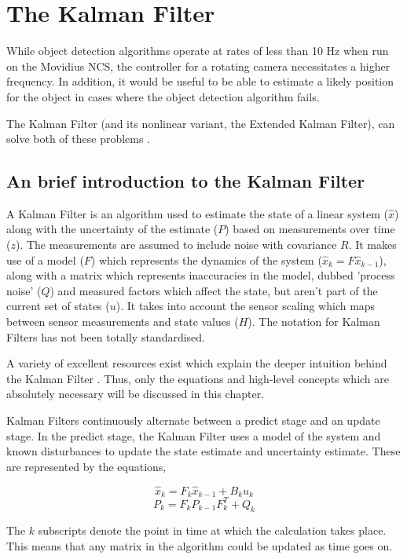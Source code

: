 \section{The Kalman Filter}

While object detection algorithms operate at rates of less than 10 Hz when run on the Movidius NCS, the controller for a rotating camera necessitates a higher frequency. In addition, it would be useful to be able to estimate a likely position for the object in cases where the object detection algorithm fails.

The Kalman Filter (and its nonlinear variant, the Extended Kalman Filter), can solve both of these problems \cite{kalman1960new}.

\subsection{An brief introduction to the Kalman Filter}
A Kalman Filter is an algorithm used to estimate the state of a linear system ($\hat{x}$) along with the uncertainty of the estimate ($P$) based on measurements over time ($z$). The measurements are assumed to include noise with covariance $R$. It makes use of a model ($F$) which represents the dynamics of the system ($\hat{x}_{k} = F\hat{x}_{k-1}$), along with a matrix which represents inaccuracies in the model, dubbed 'process noise' ($Q$) and measured factors which affect the state, but aren't part of the current set of states ($u$). It takes into account the sensor scaling which maps between sensor measurements and state values ($H$). The notation for Kalman Filters has not been totally standardised.

A variety of excellent resources exist which explain the deeper intuition behind the Kalman Filter \cite{website:wlu_kalman_tutorial, website:bzarg_kalman_tutorial}. Thus, only the equations and high-level concepts which are absolutely necessary will be discussed in this chapter.

Kalman Filters continuously alternate between a predict stage and an update stage. In the predict stage, the Kalman Filter uses a model of the system and known disturbances to update the state estimate and uncertainty estimate. These are represented by the equations,

\[ \hat{x}_k = F_k \hat{x}_{k-1} + B_k u_k \]
\[ P_k = F_k P_{k-1} F_k^T + Q_k \]

The $k$ subscripts denote the point in time at which the calculation takes place. This means that any matrix in the algorithm could be updated as time goes on.

